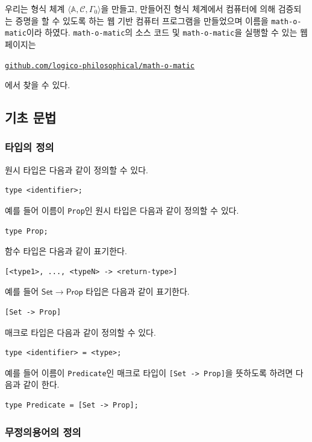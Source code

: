 \documentclass[10pt,twocolumn]{article}
\theoremstyle{definition}
\newcommand{\Prop}{\mathsf{Prop}}
\newcommand{\Set}{\mathsf{Set}}
\begin{document}
우리는 형식 체계 $\langle\mathbb A, \mathcal C, \Gamma_0\rangle$을 만들고, 만들어진 형식 체계에서 컴퓨터에 의해 검증되는 증명을 할 수 있도록 하는 웹 기반 컴퓨터 프로그램을 만들었으며 이름을 \texttt{math-o-matic}이라 하였다. \texttt{math-o-matic}의 소스 코드 및 \texttt{math-o-matic}을 실행할 수 있는 웹 페이지는
\begin{center}
	\href{https://github.com/logico-philosophical/math-o-matic}{\texttt{github.com/logico-philosophical/math-o-matic}}
\end{center}
에서 찾을 수 있다.

\subsection{기초 문법}

\subsubsection{타입의 정의}

원시 타입은 다음과 같이 정의할 수 있다.

\begin{lstlisting}
type <identifier>;
\end{lstlisting}
예를 들어 이름이 \verb!Prop!인 원시 타입은 다음과 같이 정의할 수 있다.
\begin{lstlisting}
type Prop;
\end{lstlisting}

함수 타입은 다음과 같이 표기한다.
\begin{lstlisting}
[<type1>, ..., <typeN> -> <return-type>]
\end{lstlisting}
예를 들어 $\Set\to\Prop$ 타입은 다음과 같이 표기한다.
\begin{lstlisting}
[Set -> Prop]
\end{lstlisting}

매크로 타입은 다음과 같이 정의할 수 있다.
\begin{lstlisting}
type <identifier> = <type>;
\end{lstlisting}
예를 들어 이름이 \verb!Predicate!인 매크로 타입이 \verb![Set -> Prop]!을 뜻하도록 하려면 다음과 같이 한다.
\begin{lstlisting}
type Predicate = [Set -> Prop];
\end{lstlisting}

\subsubsection{무정의용어의 정의}
\end{document}
